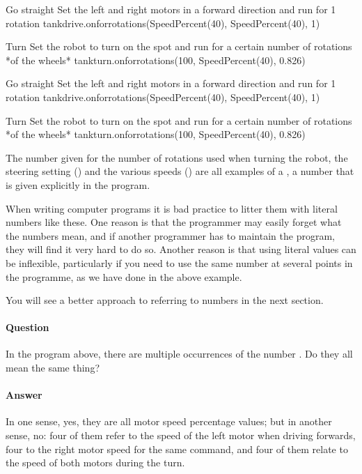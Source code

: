 \documentclass[letterpaper,10pt,english]{sphinxmanual}
\begin{document}
{{\begin{sphinxVerbatim}[commandchars=\\\{\}]
\PYGZsh{}Go straight
\PYGZsh{} Set the left and right motors in a forward direction
\PYGZsh{} and run for 1 rotation
tank\PYGZus{}drive.on\PYGZus{}for\PYGZus{}rotations(SpeedPercent(40), SpeedPercent(40), 1)

\PYGZsh{}Turn
\PYGZsh{} Set the robot to turn on the spot
\PYGZsh{} and run for a certain number of rotations *of the wheels*
tank\PYGZus{}turn.on\PYGZus{}for\PYGZus{}rotations(\PYGZhy{}100, SpeedPercent(40), 0.826)

\PYGZsh{}Go straight
\PYGZsh{} Set the left and right motors in a forward direction
\PYGZsh{} and run for 1 rotation
tank\PYGZus{}drive.on\PYGZus{}for\PYGZus{}rotations(SpeedPercent(40), SpeedPercent(40), 1)

\PYGZsh{}Turn
\PYGZsh{} Set the robot to turn on the spot
\PYGZsh{} and run for a certain number of rotations *of the wheels*
tank\PYGZus{}turn.on\PYGZus{}for\PYGZus{}rotations(\PYGZhy{}100, SpeedPercent(40), 0.826)
\end{sphinxVerbatim}
}

The number  given for the number of rotations used when turning the robot, the steering setting () and the various speeds () are all examples of a , a number that is given explicitly in the program.

When writing computer programs it is bad practice to litter them with literal numbers like these. One reason is that the programmer may easily forget what the numbers mean, and if another programmer has to maintain the program, they will find it very hard to do so. Another reason is that using literal values can be inflexible, particularly if you need to use the same number at several points in the programme, as we have done in the above example.

You will see a better approach to referring to numbers in the next section.


\paragraph{Question}
\label{\detokenize{content/01_Robot_Lab/Section_00_02:Question}}
In the program above, there are multiple occurrences of the number . Do they all mean the same thing?


\paragraph{Answer}
\label{\detokenize{content/01_Robot_Lab/Section_00_02:Answer}}
In one sense, yes, they are all motor speed percentage values; but in another sense, no: four of them refer to the speed of the left motor when driving forwards, four to the right motor speed for the same command, and four of them relate to the speed of both motors during the turn.


}
\end{document}
